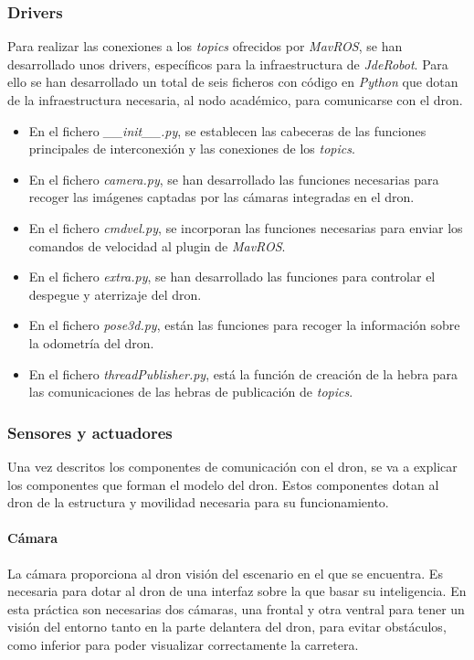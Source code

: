 \subsubsection{Drivers}
Para realizar las conexiones a los \textit{topics} ofrecidos por \textit{MavROS}, se han desarrollado unos drivers, específicos para la infraestructura de \textit{JdeRobot}. Para ello se han desarrollado un total de seis ficheros con código en \textit{Python} que dotan de la infraestructura necesaria, al nodo académico, para comunicarse con el dron.

\begin{itemize}
    \item En el fichero \textit{\_\_init\_\_.py}, se establecen las cabeceras de las funciones principales de interconexión y las conexiones de los \textit{topics}.
    \item En el fichero \textit{camera.py}, se han desarrollado las funciones necesarias para recoger las imágenes captadas por las cámaras integradas en el dron.
    \item En el fichero \textit{cmdvel.py}, se incorporan las funciones necesarias para enviar los comandos de velocidad al plugin de \textit{MavROS}.
    \item En el fichero \textit{extra.py}, se han desarrollado las funciones para controlar el despegue y aterrizaje del dron.
    \item En el fichero \textit{pose3d.py}, están las funciones para recoger la información sobre la odometría del dron.
    \item En el fichero \textit{threadPublisher.py}, está la función de creación de la hebra para las comunicaciones de las hebras de publicación de \textit{topics}.
\end{itemize}


\subsubsection{Sensores y actuadores}
Una vez descritos los componentes de comunicación con el dron, se va a explicar los componentes que forman el modelo del dron. Estos componentes dotan al dron de la estructura y movilidad necesaria para su funcionamiento.

\paragraph{Cámara}
La cámara proporciona al dron visión del escenario en el que se encuentra. Es necesaria para dotar al dron de una interfaz sobre la que basar su inteligencia. En esta práctica son necesarias dos cámaras, una frontal y otra ventral para tener un visión del entorno tanto en la parte delantera del dron, para evitar obstáculos, como inferior para poder visualizar correctamente la carretera.

